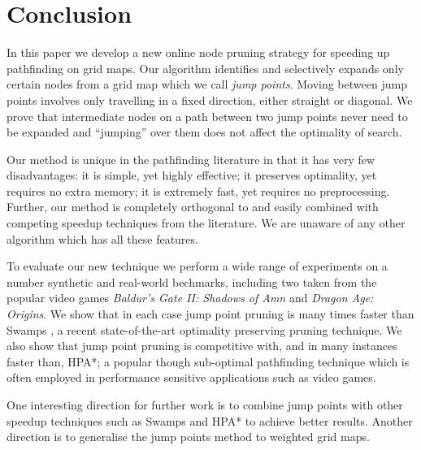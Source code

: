 \section{Conclusion}
In this paper we develop a new online node pruning strategy for speeding up
pathfinding on grid maps.  Our algorithm identifies and selectively expands only
certain nodes from a grid map which we call \emph{jump points}.  Moving between
jump points involves only travelling in a fixed direction, either straight or
diagonal.  We prove that intermediate nodes on a path between two jump points
never need to be expanded and ``jumping'' over them does not affect the
optimality of search.
\par
Our method is unique in the pathfinding literature in that it has very few
disadvantages: it is simple, yet highly effective; it preserves optimality, yet
requires no extra memory;  it is extremely fast, yet requires no preprocessing.
Further, our method is completely orthogonal to and easily combined with 
competing speedup techniques from the literature.
We are unaware of any other algorithm which has all these features.
\par
To evaluate our new technique we perform a wide range of experiments on a number
synthetic and real-world bechmarks, including two taken from the popular video
games \emph{Baldur's Gate II: Shadows of Amn} and \emph{Dragon Age: Origins}.
We show that in each case jump point pruning is many times faster than Swamps
\cite{pochter10}, a recent state-of-the-art optimality preserving pruning
technique.  We also show that jump point pruning is competitive with, and in
many instances faster than, HPA*; a popular though sub-optimal pathfinding
technique which is often employed in performance sensitive applications such as
video games.
\par
One interesting direction for further work is to combine jump points with other
speedup techniques such as Swamps and HPA* to achieve better results.
Another direction is to generalise the jump points method to weighted grid maps.
